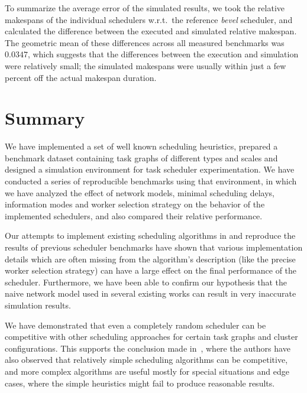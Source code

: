 To summarize the average error of the simulated results, we took the relative makespans of the
individual schedulers w.r.t.\ the reference \emph{bevel} scheduler, and calculated the
difference between the executed and simulated relative makespan. The geometric mean of these
differences across all measured benchmarks was $0.0347$, which suggests that the
differences between the execution and simulation were relatively small; the simulated makespans
were usually within just a few percent off the actual makespan duration.

\section*{Summary}
We have implemented a set of well known scheduling heuristics, prepared a benchmark dataset
containing task graphs of different types and scales and designed a simulation environment for task
scheduler experimentation. We have conducted a series of reproducible benchmarks using that
environment, in which we have analyzed the effect of network models, minimal scheduling delays,
information modes and worker selection strategy on the behavior of the implemented schedulers, and
also compared their relative performance.

Our attempts to implement existing scheduling algorithms in \estee{} and reproduce
the results of previous scheduler benchmarks have shown that various implementation details which
are often missing from the algorithm's description (like the precise worker selection strategy) can
have a large effect on the final performance of the scheduler. Furthermore, we have been able to
confirm our hypothesis that the naive network model used in several existing works can result in
very inaccurate simulation results.


We have demonstrated that even a completely random scheduler can be competitive with other
scheduling approaches for certain task graphs and cluster configurations. This supports the
conclusion made in~\cite{wang2018list}, where the authors have also observed that relatively
simple scheduling algorithms can be competitive, and more complex algorithms are useful mostly for
special situations and edge cases, where the simple heuristics might fail to produce reasonable
results.

